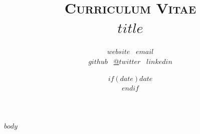 \documentclass[11pt, a4paper]{article}
\title{\textsc{Curriculum Vitae} \\ \Huge{$title$}}
\date{$if(date)$$date$\\$endif$}
\author{
    \href{https://dimitrije.website}{$website$} \faGlobe \, \textbar{}
    \href{mailto:me@dimitrije.website}{$email$} \faEnvelopeSquare \\ %
    \href{https://github.com/$github$}{$github$} \faGithub \, \textbar{}
    \href{https://twitter.com/@$twitter$}{@$twitter$} \faTwitter \, \textbar{}
    \href{https://www.linkedin.com/in/$linkedin$}{$linkedin$} \faLinkedin
}
\begin{document}
\maketitle
\thispagestyle{empty}
\begin{raggedright}
$body$
\end{raggedright}
\end{document}
